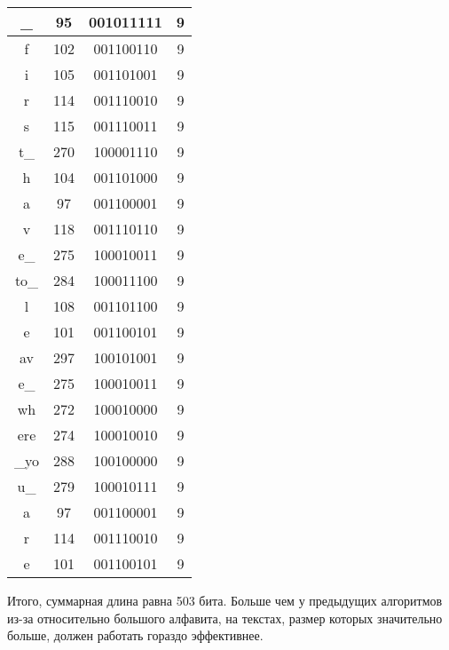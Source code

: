 \begin{center}
\begin{longtable}{|c|c|c|c|}
\_&95&001011111&9\\  \hline f&102&001100110&9\\  \hline i&105&001101001&9\\  \hline r&114&001110010&9\\  \hline s&115&001110011&9\\  \hline t\_&270&100001110&9\\  \hline h&104&001101000&9\\  \hline a&97&001100001&9\\  \hline v&118&001110110&9\\  \hline e\_&275&100010011&9\\  \hline to\_&284&100011100&9\\  \hline l&108&001101100&9\\  \hline e&101&001100101&9\\  \hline av&297&100101001&9\\  \hline e\_&275&100010011&9\\  \hline wh&272&100010000&9\\  \hline ere&274&100010010&9\\  \hline \_yo&288&100100000&9\\  \hline u\_&279&100010111&9\\  \hline a&97&001100001&9\\  \hline r&114&001110010&9\\  \hline e&101&001100101&9\\  \hline 
    \end{longtable}
\end{center}

Итого, суммарная длина равна 503 бита. Больше чем у предыдущих алгоритмов из-за относительно большого алфавита, на текстах, размер которых значительно больше, должен работать гораздо эффективнее.

